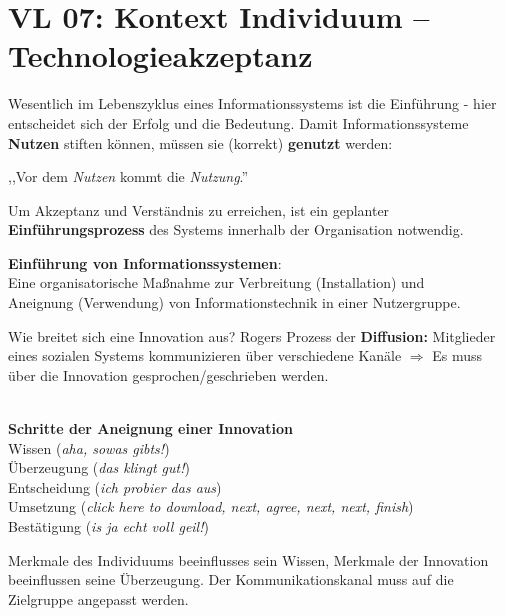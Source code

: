 \newpage
\section{VL 07: Kontext Individuum -- Technologieakzeptanz}

\begin{multicols}{2}
Wesentlich im Lebenszyklus eines Informationssystems ist die Einführung - hier entscheidet
sich der Erfolg und die Bedeutung. Damit Informationssysteme \textbf{Nutzen} stiften können,
müssen sie (korrekt) \textbf{genutzt} werden:

\begin{center}{\large,,Vor dem \emph{Nutzen} kommt die \emph{Nutzung}.''}\end{center}

Um Akzeptanz und Verständnis zu erreichen, ist ein geplanter \textbf{Einführungsprozess}
des Systems innerhalb der Organisation notwendig.

\begin{center}{\textbf{Einführung von Informationssystemen}:\\
Eine organisatorische Maßnahme zur Verbreitung (Installation) und\\
Aneignung (Verwendung) von Informationstechnik in einer Nutzergruppe.}\end{center}

Wie breitet sich eine Innovation aus? Rogers Prozess der \textbf{Diffusion:} Mitglieder eines
sozialen Systems kommunizieren über verschiedene Kanäle $\Rightarrow$ Es muss über die
Innovation gesprochen/geschrieben werden.
\\
\\

\begin{center}
\textbf{Schritte der Aneignung einer Innovation}\\
Wissen (\emph{aha, sowas gibts!})\\
Überzeugung (\emph{das klingt gut!})\\
Entscheidung (\emph{ich probier das aus})\\
Umsetzung (\emph{click here to download, next, agree, next, next, finish})\\
Bestätigung (\emph{is ja echt voll geil!})
\end{center}

Merkmale des Individuums beeinflusses sein Wissen, Merkmale der Innovation beeinflussen
seine Überzeugung. Der Kommunikationskanal muss auf die Zielgruppe angepasst werden.


\end{multicols}

